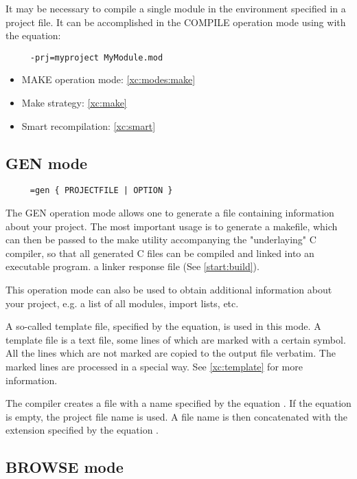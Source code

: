 It may be necessary to compile a single module in the environment
specified in a project file. It can be accomplished in the COMPILE
operation mode using with the  equation:

\verb'    '\xc{}\verb' -prj=myproject MyModule.mod'

\Seealso
\begin{itemize}
\item   MAKE operation mode: \ref{xc:modes:make}
\item   Make strategy: \ref{xc:make}
\item   Smart recompilation: \ref{xc:smart}
\end{itemize}

\subsection{GEN mode}\label{xc:modes:gen}

\verb'    '\xc{}\verb' =gen { PROJECTFILE | OPTION }'

The  GEN operation mode allows one to generate a file containing
information about your project. The most important usage is to
generate
\ifgenc
  a makefile, which can then be passed to the make utility
  accompanying the "underlaying" C compiler, so that all
  generated C files can be compiled and linked into an
  executable program.
\else
  a linker response file (See \ref{start:build}).
\fi

This operation mode can also be used to obtain additional
information about your project, e.g. a list of all
modules, import lists, etc.

A so-called template file, specified by the  equation,
is used in this mode. A template file is a text file, some lines of which are
marked with a certain symbol. All the lines which are not marked are
copied to the output file verbatim. The marked lines are processed
in a special way. See \ref{xc:template} for more information.

The compiler creates a file with a name specified by
the equation . If the equation is empty,
the project file name is used.
A file name is then concatenated with the
extension specified by the equation .

\subsection{BROWSE mode}\label{xc:modes:browse}


